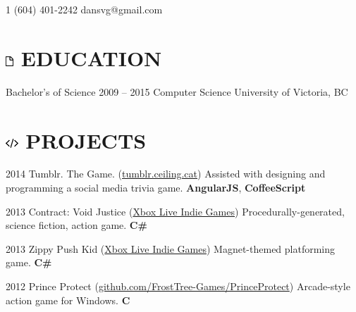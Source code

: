 \documentclass[10pt]{tccv}
\begin{document}
    {1 (604) 401-2242}
    {dansvg@gmail.com}

\section{\includegraphics[height=10pt, keepaspectratio=true]{file} EDUCATION}

\begin{yearlist}

\item[Bachelor's of Science]{2009 -- 2015}
     {Computer Science}
     {University of Victoria, BC}

\end{yearlist}

\section{\includegraphics[height=10pt, keepaspectratio=true]{code} PROJECTS}

\begin{yearlist}

\item{2014}
     {Tumblr. The Game. (\href{http://tumblr.ceiling.cat/}{tumblr.ceiling.cat})}
     {Assisted with designing and programming a social media trivia game. \textbf{AngularJS}, \textbf{CoffeeScript}}

\item{2013}
     {Contract: Void Justice (\href{http://marketplace.xbox.com/en-US/Product/Contract-Void-Justice/66acd000-77fe-1000-9115-d80258550d94}{Xbox Live Indie Games})}
     {Procedurally-generated, science fiction, action game. \textbf{C\#}}

\item{2013}
     {Zippy Push Kid (\href{http://marketplace.xbox.com/en-ca/Product/Zippy-Push-Kid/66acd000-77fe-1000-9115-d80258550cd6}{Xbox Live Indie Games})}
     {Magnet-themed platforming game. \textbf{C\#}}

\item{2012}
     {Prince Protect (\href{https://github.com/FrostTree-Games/PrinceProtect}{github.com/FrostTree-Games/PrinceProtect})}
     {Arcade-style action game for Windows. \textbf{C}}

\end{yearlist}
\end{document}
